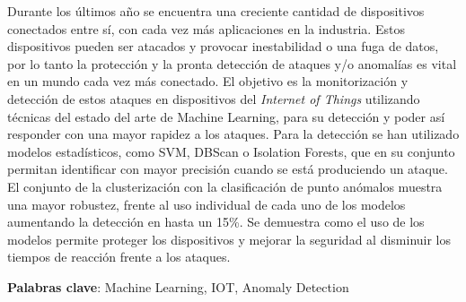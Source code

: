 Durante los últimos año se encuentra una creciente cantidad de dispositivos conectados entre sí, con cada vez más aplicaciones en la industria. Estos dispositivos pueden ser atacados y provocar inestabilidad o una fuga de datos, por lo tanto la protección y la pronta detección de ataques y/o anomalías es vital en un mundo cada vez más conectado. El objetivo es la monitorización y detección de estos ataques en dispositivos del \textit{Internet of Things} utilizando técnicas del estado del arte de Machine Learning, para su detección y poder así responder con una mayor rapidez a los ataques. Para la detección se han utilizado modelos estadísticos, como SVM, DBScan o Isolation Forests, que en su conjunto permitan identificar con mayor precisión cuando se está produciendo un ataque. El conjunto de la clusterización con la clasificación de punto anómalos muestra una mayor robustez, frente al uso individual de cada uno de los modelos aumentando la detección en hasta un 15\%. Se demuestra como el uso de los modelos permite proteger los dispositivos y mejorar la seguridad al disminuir los tiempos de reacción frente a los ataques.

\vspace{0.5cm}
\textbf{Palabras clave}: Machine Learning, IOT, Anomaly Detection